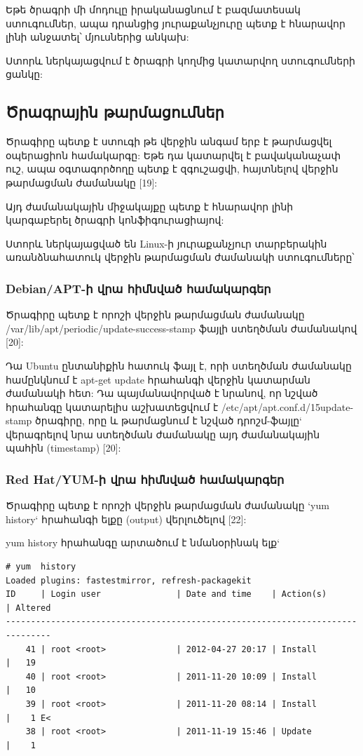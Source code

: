 \documentclass[a4paper,12pt]{article}
\begin{document}
\begin{sloppypar}
Եթե ծրագրի մի մոդուլը իրականացնում է բազմատեսակ ստուգումներ,
ապա դրանցից յուրաքանչյուրը պետք է հնարավոր լինի անջատել՝
մյուսներից անկախ:

Ստորև ներկայացվում է ծրագրի կողմից կատարվող ստուգումների ցանկը:


\subsection{Ծրագրային թարմացումներ}

Ծրագիրը պետք է ստուգի թե վերջին անգամ երբ է թարմացվել
օպերացիոն համակարգը:
Եթե դա կատարվել է բավականաչափ ուշ, ապա օգտագործողը պետք է
զգուշացվի, հայտնելով վերջին թարմացման ժամանակը [19]:

Այդ ժամանակային միջակայքը պետք է հնարավոր լինի կարգաբերել ծրագրի կոնֆիգուրացիայով:

Ստորև ներկայացված են Linux-ի յուրաքանչյուր տարբերակին առանձնահատուկ
վերջին թարմացման ժամանակի ստուգումները՝

\subsubsection{Debian/APT-ի վրա հիմնված համակարգեր}

Ծրագիրը պետք է որոշի վերջին թարմացման ժամանակը
/var/lib/apt/periodic/update-success-stamp
ֆայլի ստեղծման ժամանակով [20]:

Դա Ubuntu ընտանիքին հատուկ ֆայլ է, որի ստեղծման ժամանակը համընկնում է
apt-get update հրահանգի վերջին կատարման ժամանակի հետ: Դա պայմանավորված է
նրանով, որ նշված հրահանգը կատարելիս աշխատեցվում է
/etc/apt/apt.conf.d/15update-stamp
ծրագիրը, որը և թարմացնում է նշված դրոշմ-ֆայլը` վերագրելով նրա
ստեղծման ժամանակը այդ ժամանակային պահին (timestamp) [20]:

\subsubsection{Red Hat/YUM-ի վրա հիմնված համակարգեր}

Ծրագիրը պետք է որոշի վերջին թարմացման ժամանակը `yum history`
հրահանգի ելքը (output) վերլուծելով [22]:

yum history հրահանգը արտածում է նմանօրինակ ելք`

\begin{lstlisting}[language={}]
# yum  history
Loaded plugins: fastestmirror, refresh-packagekit
ID     | Login user               | Date and time    | Action(s)      | Altered
-------------------------------------------------------------------------------
    41 | root <root>              | 2012-04-27 20:17 | Install        |   19   
    40 | root <root>              | 2011-11-20 10:09 | Install        |   10   
    39 | root <root>              | 2011-11-20 08:14 | Install        |    1 E<
    38 | root <root>              | 2011-11-19 15:46 | Update         |    1 
\end{lstlisting}



\end{sloppypar}
\end{document}
